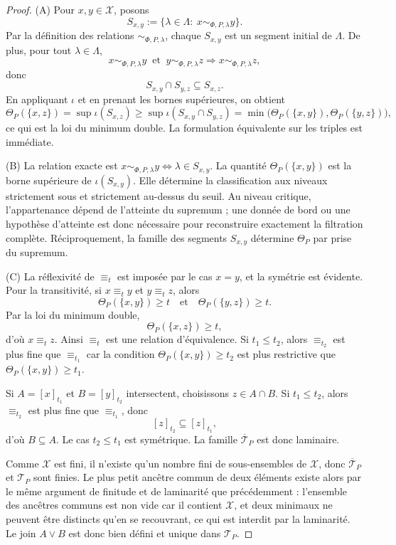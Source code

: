 \documentclass[11pt,a4paper,openany]{book}
\begin{document}
\begin{proof}
(A) Pour \(x,y\in\mathcal X\), posons
\[
S_{x,y}:=\{\lambda\in\Lambda:\ x\sim_{\Phi,P,\lambda}y\}.
\]
Par la définition des relations \(\sim_{\Phi,P,\lambda}\), chaque \(S_{x,y}\) est un segment initial de \(\Lambda\). De plus, pour tout \(\lambda\in\Lambda\),
\[
x\sim_{\Phi,P,\lambda}y\ \text{ et }\ y\sim_{\Phi,P,\lambda}z
\Longrightarrow
x\sim_{\Phi,P,\lambda}z,
\]
donc
\[
S_{x,y}\cap S_{y,z}\subseteq S_{x,z}.
\]
En appliquant \(\iota\) et en prenant les bornes supérieures, on obtient
\[
\Theta_P(\{x,z\})
=
\sup \iota(S_{x,z})
\ge
\sup \iota(S_{x,y}\cap S_{y,z})
=
\min\bigl(\Theta_P(\{x,y\}),\Theta_P(\{y,z\})\bigr),
\]
ce qui est la loi du minimum double. La formulation équivalente sur les triples est immédiate.

(B) La relation exacte est \(x\sim_{\Phi,P,\lambda}y \Longleftrightarrow \lambda\in S_{x,y}\). La quantité \(\Theta_P(\{x,y\})\) est la borne supérieure de \(\iota(S_{x,y})\). Elle détermine la classification aux niveaux strictement sous et strictement au-dessus du seuil. Au niveau critique, l'appartenance dépend de l'atteinte du supremum ; une donnée de bord ou une hypothèse d'atteinte est donc nécessaire pour reconstruire exactement la filtration complète. Réciproquement, la famille des segments \(S_{x,y}\) détermine \(\Theta_P\) par prise du supremum.

(C) La réflexivité de \(\equiv_t\) est imposée par le cas \(x=y\), et la symétrie est évidente. Pour la transitivité, si \(x\equiv_t y\) et \(y\equiv_t z\), alors
\[
\Theta_P(\{x,y\})\ge t
\quad\text{et}\quad
\Theta_P(\{y,z\})\ge t.
\]
Par la loi du minimum double,
\[
\Theta_P(\{x,z\})\ge t,
\]
d'où \(x\equiv_t z\). Ainsi \(\equiv_t\) est une relation d'équivalence. Si \(t_1\le t_2\), alors \(\equiv_{t_2}\) est plus fine que \(\equiv_{t_1}\) car la condition \(\Theta_P(\{x,y\})\ge t_2\) est plus restrictive que \(\Theta_P(\{x,y\})\ge t_1\).

Si \(A=[x]_{t_1}\) et \(B=[y]_{t_2}\) intersectent, choisissons \(z\in A\cap B\). Si \(t_1\le t_2\), alors \(\equiv_{t_2}\) est plus fine que \(\equiv_{t_1}\), donc
\[
[z]_{t_2}\subseteq [z]_{t_1},
\]
d'où \(B\subseteq A\). Le cas \(t_2\le t_1\) est symétrique. La famille \(\overline{\mathcal T}_P\) est donc laminaire.

Comme \(\mathcal X\) est fini, il n'existe qu'un nombre fini de sous-ensembles de \(\mathcal X\), donc \(\overline{\mathcal T}_P\) et \(\mathcal T_P\) sont finies. Le plus petit ancêtre commun de deux éléments existe alors par le même argument de finitude et de laminarité que précédemment : l'ensemble des ancêtres communs est non vide car il contient \(\mathcal X\), et deux minimaux ne peuvent être distincts qu'en se recouvrant, ce qui est interdit par la laminarité. Le join \(A\vee B\) est donc bien défini et unique dans \(\mathcal T_P\).


\end{proof}
\end{document}
